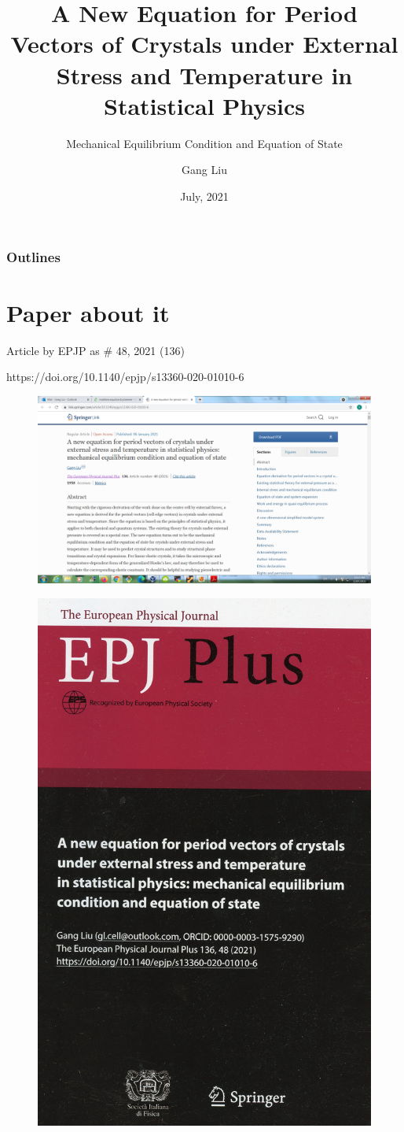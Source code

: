 \documentclass[8pt]{beamer}
\title{A New Equation for Period Vectors of Crystals under External Stress and Temperature in Statistical Physics}
\subtitle{ {\color{yellow} Mechanical Equilibrium Condition and Equation of State}}
\author{Gang Liu}
\institute
{ gl.cell@outlook.com \\
https://github.com/LiuGangKingston \\
http://www.linkedin.com/in/liuganglinkedin \\
https://doi.org/10.1140/epjp/s13360-020-01010-6 \\
Independent Researcher, Kingston, Ontario, Canada
}
\date {July, 2021}
\begin{document}
\frame{\titlepage}

\begin{frame}
\frametitle{Outlines}
\tableofcontents
\end{frame}




\section{Paper about it}

\begin{frame}{Article by EPJP as \# 48, 2021 (136)}

{\centering \vspace{.2cm} {https://doi.org/10.1140/epjp/s13360-020-01010-6} }

\pause 
\begin{figure} 
      \includegraphics[width=1.\textwidth]{./0081.png}
\end{figure} 
       
\pause 
\vspace{-8.15cm} 
\begin{figure} \hspace{9.5cm}
      \includegraphics[width=.31\textwidth]{./img264.jpg}
\end{figure}

\end{frame}
\end{document}
